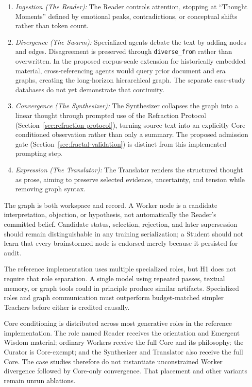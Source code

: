 \begin{enumerate}
    \item \emph{Ingestion (The Reader):} The Reader controls attention,
    stopping at ``Thought Moments'' defined by emotional peaks,
    contradictions, or conceptual shifts rather than token count.

    \item \emph{Divergence (The Swarm):} Specialized agents debate the text by
    adding nodes and edges. Disagreement is preserved through
    \texttt{diverse\_from} rather than overwritten. In the proposed corpus-scale extension for historically embedded
    material, cross-referencing agents would query prior document and era
    graphs, creating the long-horizon hierarchical graph. The separate
    case-study databases do not yet demonstrate that continuity.

    \item \emph{Convergence (The Synthesizer):} The Synthesizer collapses the
    graph into a linear thought through prompted use of the Refraction Protocol
    (Section~\ref{sec:refraction-protocol}), turning source text into an
    explicitly Core-conditioned observation rather than only a summary.
    The proposed admission gate (Section~\ref{sec:fractal-validation}) is distinct from this
    implemented prompting step.

    \item \emph{Expression (The Translator):} The Translator renders the
    structured thought as prose, aiming to preserve selected evidence,
    uncertainty, and tension while removing graph syntax.
\end{enumerate}

The graph is both workspace and record. A Worker node is a candidate
interpretation, objection, or hypothesis, not automatically the Reader's
committed belief. Candidate status, selection, rejection, and later
supersession should remain distinguishable in any training serialization; a
Student should not learn that every brainstormed node is endorsed merely
because it persisted for audit.

The reference implementation uses multiple specialized roles, but H1 does not
require that role separation. A single model using repeated passes, textual
memory, or graph tools could in principle produce similar artifacts. Specialized
roles and graph communication must outperform budget-matched simpler Teachers
before either is credited causally.

Core conditioning is distributed across most generative roles in the reference
implementation. The role named Reader receives the orientation and Emergent
Wisdom material; ordinary Workers receive the full Core and its philosophy; the
Curator is Core-exempt; and the Synthesizer and Translator also receive the full
Core. The case studies therefore do not instantiate unconstrained Worker
divergence followed by Core-only convergence. That placement and other variants
remain unrun ablations.

